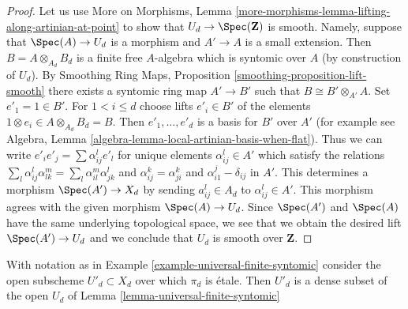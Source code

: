 \begin{proof}
Let us use More on Morphisms, Lemma
\ref{more-morphisms-lemma-lifting-along-artinian-at-point}
to show that $U_d \to \Spec(\mathbf{Z})$ is smooth.
Namely, suppose that $\Spec(A) \to U_d$ is a morphism
and $A' \to A$ is a small extension. Then $B = A \otimes_{A_d} B_d$
is a finite free $A$-algebra which is syntomic over $A$
(by construction of $U_d$). By
Smoothing Ring Maps, Proposition \ref{smoothing-proposition-lift-smooth}
there exists a syntomic ring map $A' \to B'$ such that
$B \cong B' \otimes_{A'} A$. Set $e'_1 = 1 \in B'$. For $1 < i \leq d$
choose lifts $e'_i \in B'$ of the elements
$1 \otimes e_i \in A \otimes_{A_d} B_d = B$. Then $e'_1, \ldots, e'_d$
is a basis for $B'$ over $A'$ (for example see Algebra, Lemma
\ref{algebra-lemma-local-artinian-basis-when-flat}).
Thus we can write $e'_i e'_j = \sum \alpha_{ij}^l e'_l$ for unique
elements $\alpha_{ij}^l \in A'$ which satisfy the relations
$\sum_l \alpha_{ij}^l \alpha_{lk}^m = \sum_l \alpha_{il}^m \alpha _{jk}^l$
and $\alpha_{ij}^k = \alpha_{ji}^k$ and $\alpha_{i1}^j - \delta_{ij}$
in $A'$. This determines a morphism $\Spec(A') \to X_d$ by
sending $a_{ij}^l \in A_d$ to $\alpha_{ij}^l \in A'$. This morphism
agrees with the given morphism $\Spec(A) \to U_d$. Since $\Spec(A')$
and $\Spec(A)$ have the same underlying topological space, we see
that we obtain the desired lift $\Spec(A') \to U_d$ and we
conclude that $U_d$ is smooth over $\mathbf{Z}$.
\end{proof}

\begin{lemma}
\label{lemma-universal-finite-syntomic-etale}
With notation as in Example \ref{example-universal-finite-syntomic}
consider the open subscheme $U'_d \subset X_d$ over which
$\pi_d$ is \'etale. Then $U'_d$ is a dense subset of the
open $U_d$ of Lemma \ref{lemma-universal-finite-syntomic}
\end{lemma}

